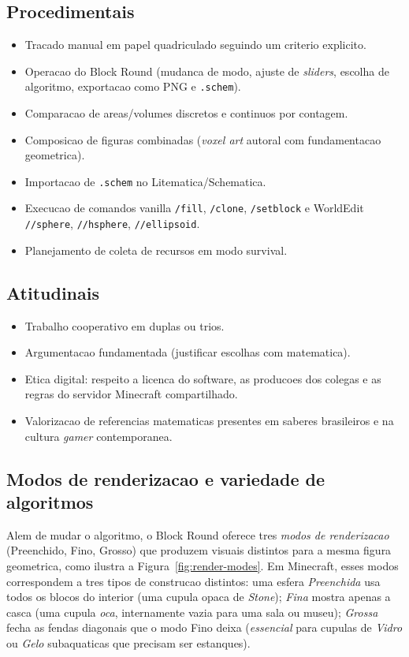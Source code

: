 \documentclass[12pt,a4paper]{scrartcl}
\newcommand{\cmd}[1]{\textcolor{earth}{\texttt{\small #1}}}
\begin{document}
\subsection{Procedimentais}
\begin{itemize}[leftmargin=1.3em,itemsep=0.15em,topsep=0.3em]
  \item Tracado manual em papel quadriculado seguindo um criterio explicito.
  \item Operacao do Block Round (mudanca de modo, ajuste de \emph{sliders}, escolha de algoritmo, exportacao como PNG e \texttt{.schem}).
  \item Comparacao de areas/volumes discretos e continuos por contagem.
  \item Composicao de figuras combinadas (\emph{voxel art} autoral com fundamentacao geometrica).
  \item Importacao de \texttt{.schem} no Litematica/Schematica.
  \item Execucao de comandos vanilla \cmd{/fill}, \cmd{/clone}, \cmd{/setblock} e WorldEdit \cmd{//sphere}, \cmd{//hsphere}, \cmd{//ellipsoid}.
  \item Planejamento de coleta de recursos em modo survival.
\end{itemize}

\subsection{Atitudinais}
\begin{itemize}[leftmargin=1.3em,itemsep=0.15em,topsep=0.3em]
  \item Trabalho cooperativo em duplas ou trios.
  \item Argumentacao fundamentada (justificar escolhas com matematica).
  \item Etica digital: respeito a licenca do software, as producoes dos colegas e as regras do servidor Minecraft compartilhado.
  \item Valorizacao de referencias matematicas presentes em saberes brasileiros e na cultura \emph{gamer} contemporanea.
\end{itemize}

\subsection{Modos de renderizacao e variedade de algoritmos}

Alem de mudar o algoritmo, o Block Round oferece tres \emph{modos de renderizacao} (Preenchido, Fino, Grosso) que produzem visuais distintos para a mesma figura geometrica, como ilustra a Figura~\ref{fig:render-modes}. Em Minecraft, esses modos correspondem a tres tipos de construcao distintos: uma esfera \emph{Preenchida} usa todos os blocos do interior (uma cupula opaca de \emph{Stone}); \emph{Fina} mostra apenas a casca (uma cupula \emph{oca}, internamente vazia para uma sala ou museu); \emph{Grossa} fecha as fendas diagonais que o modo Fino deixa (\emph{essencial} para cupulas de \emph{Vidro} ou \emph{Gelo} subaquaticas que precisam ser estanques).
\end{document}
